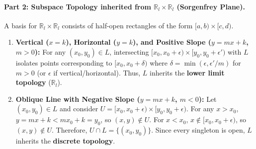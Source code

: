 \paragraph{Part 2: Subspace Topology inherited from $\mathbb{R}_l\times\mathbb{R}_l$ (Sorgenfrey Plane).}
A basis for $\mathbb{R}_l\times\mathbb{R}_l$ consists of half-open rectangles of the form
$[a,b)\times[c,d)$.

\begin{enumerate}[label=(\alph*)]
  \item \textbf{Vertical ($x=k$), Horizontal ($y=k$), and Positive Slope ($y=mx+k$, $m>0$):}
    For any $(x_0,y_0)\in L$, intersecting $[x_0,x_0+\epsilon)\times[y_0,y_0+\epsilon')$ with
    $L$ isolates points corresponding to $[x_0,x_0+\delta)$ where
    $\delta=\min(\epsilon,\epsilon'/m)$ for $m>0$ (or $\epsilon$ if vertical/horizontal). Thus,
    $L$ inherits the \textbf{lower limit topology} ($\mathbb{R}_l$).

  \item \textbf{Oblique Line with Negative Slope ($y=mx+k$, $m<0$):}
    Let $(x_0,y_0)\in L$ and consider $U=[x_0,x_0+\epsilon)\times[y_0,y_0+\epsilon)$.
    For any $x>x_0$, $y=mx+k<mx_0+k=y_0$, so $(x,y)\notin U$.
    For $x<x_0$, $x\notin[x_0,x_0+\epsilon)$, so $(x,y)\notin U$.
    Therefore, $U\cap L=\{(x_0,y_0)\}$. Since every singleton is open, $L$ inherits the
    \textbf{discrete topology}.
\end{enumerate}
